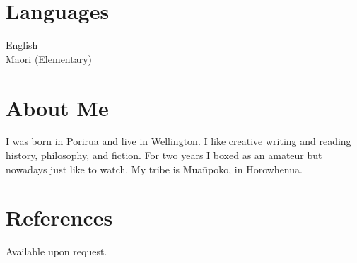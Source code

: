 \documentclass[margin,line]{res}
\begin{document}
\begin{resume}
\section{\sc Languages}
English\\
M\=aori (Elementary)

\section{\sc About Me}
I was born in Porirua and live in Wellington. I like creative writing and reading history, philosophy, and fiction. For two years I boxed as an amateur but nowadays just like to watch. My tribe is Mua\=upoko, in Horowhenua.

\section{\sc References}
Available upon request.

\end{resume}
\end{document}

